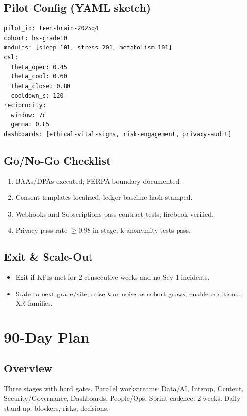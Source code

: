 \documentclass[11pt]{article}
\theoremstyle{plain}
\begin{document}
\subsection{Pilot Config (YAML sketch)}
\begin{verbatim}
pilot_id: teen-brain-2025q4
cohort: hs-grade10
modules: [sleep-101, stress-201, metabolism-101]
csl:
  theta_open: 0.45
  theta_cool: 0.60
  theta_close: 0.80
  cooldown_s: 120
reciprocity:
  window: 7d
  gamma: 0.85
dashboards: [ethical-vital-signs, risk-engagement, privacy-audit]
\end{verbatim}

\subsection{Go/No-Go Checklist}
\begin{enumerate}
  \item BAAs/DPAs executed; FERPA boundary documented.
  \item Consent templates localized; ledger baseline hash stamped.
  \item Webhooks and Subscriptions pass contract tests; firebook verified.
  \item Privacy pass-rate $\ge 0.98$ in stage; k-anonymity tests pass.
\end{enumerate}

\subsection{Exit \& Scale-Out}
\begin{itemize}
  \item Exit if KPIs met for 2 consecutive weeks and no Sev-1 incidents.
  \item Scale to next grade/site; raise $k$ or noise as cohort grows; enable additional XR families.
\end{itemize}

\section{90-Day Plan}

\subsection{Overview}
Three stages with hard gates. Parallel workstreams: Data/AI, Interop, Content, Security/Governance, Dashboards, People/Ops. Sprint cadence: 2 weeks. Daily stand-up: blockers, risks, decisions.
\end{document}
